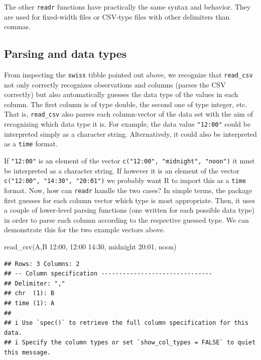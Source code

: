 \documentclass[
  12pt,
]{style/krantz}
\newenvironment{Shaded}{\begin{snugshade}}{\end{snugshade}}
\newcommand{\FunctionTok}[1]{\textcolor[rgb]{0.00,0.00,0.00}{#1}}
\newcommand{\NormalTok}[1]{#1}
\newcommand{\StringTok}[1]{\textcolor[rgb]{0.31,0.60,0.02}{#1}}
\begin{document}
The other \texttt{readr} functions have practically the same syntax and behavior. They are used for fixed-width files or CSV-type files with other delimiters than commas.

\hypertarget{parsing-and-data-types}{%
\subsection{Parsing and data types}\label{parsing-and-data-types}}

From inspecting the \texttt{swiss} tibble pointed out above, we recognize that \texttt{read\_csv} not only correctly recognizes observations and columns (parses the CSV correctly) but also automatically guesses the data type of the values in each column. The first column is of type double, the second one of type integer, etc. That is, \texttt{read\_csv} also parses each column-vector of the data set with the aim of recognizing which data type it is. For example, the data value \texttt{"12:00"} could be interpreted simply as a character string. Alternatively, it could also be interpreted as a \texttt{time} format.

If \texttt{"12:00"} is an element of the vector \texttt{c("12:00",\ "midnight",\ "noon")} it must be interpreted as a character string. If however it is an element of the vector \texttt{c("12:00",\ "14:30",\ "20:01")} we probably want R to import this as a \texttt{time} format. Now, how can \texttt{readr} handle the two cases? In simple terms, the package first guesses for each column vector which type is most appropriate. Then, it uses a couple of lower-level parsing functions (one written for each possible data type) in order to parse each column according to the respective guessed type. We can demonstrate this for the two example vectors above.

\begin{Shaded}
\begin{Highlighting}[]
\FunctionTok{read\_csv}\NormalTok{(}\StringTok{\textquotesingle{}A,B}
\StringTok{         12:00, 12:00}
\StringTok{         14:30, midnight}
\StringTok{         20:01, noon\textquotesingle{}}\NormalTok{)}
\end{Highlighting}
\end{Shaded}

\begin{verbatim}
## Rows: 3 Columns: 2
## -- Column specification -------------------------------
## Delimiter: ","
## chr  (1): B
## time (1): A
## 
## i Use `spec()` to retrieve the full column specification for this data.
## i Specify the column types or set `show_col_types = FALSE` to quiet this message.
\end{verbatim}
\end{document}
